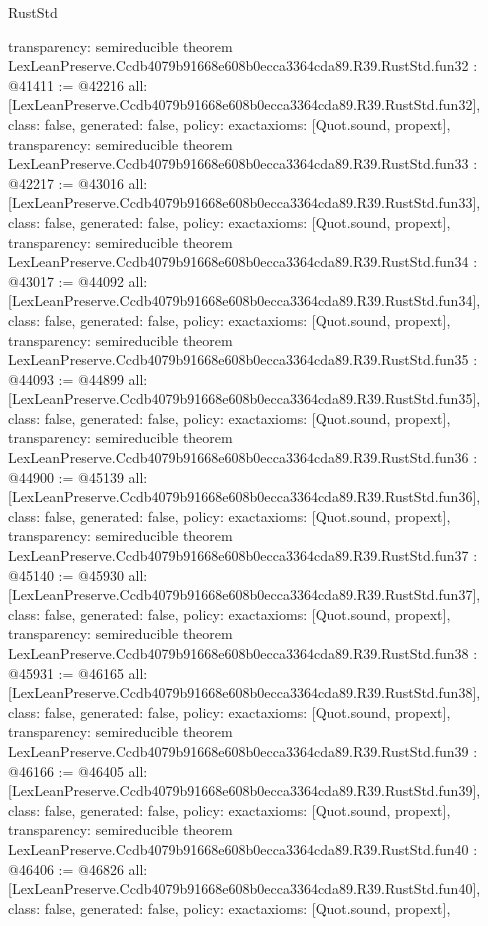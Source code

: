 \begin{lexlean}{RustStd}
\begin{coremodule}
{  transparency: semireducible
}
theorem LexLeanPreserve.Ccdb4079b91668e608b0ecca3364cda89.R39.RustStd.fun32 : @41411 := @42216 {
  all: [LexLeanPreserve.Ccdb4079b91668e608b0ecca3364cda89.R39.RustStd.fun32],
  class: false,
  generated: false,
  policy: exact{axioms: [Quot.sound, propext]},
  transparency: semireducible
}
theorem LexLeanPreserve.Ccdb4079b91668e608b0ecca3364cda89.R39.RustStd.fun33 : @42217 := @43016 {
  all: [LexLeanPreserve.Ccdb4079b91668e608b0ecca3364cda89.R39.RustStd.fun33],
  class: false,
  generated: false,
  policy: exact{axioms: [Quot.sound, propext]},
  transparency: semireducible
}
theorem LexLeanPreserve.Ccdb4079b91668e608b0ecca3364cda89.R39.RustStd.fun34 : @43017 := @44092 {
  all: [LexLeanPreserve.Ccdb4079b91668e608b0ecca3364cda89.R39.RustStd.fun34],
  class: false,
  generated: false,
  policy: exact{axioms: [Quot.sound, propext]},
  transparency: semireducible
}
theorem LexLeanPreserve.Ccdb4079b91668e608b0ecca3364cda89.R39.RustStd.fun35 : @44093 := @44899 {
  all: [LexLeanPreserve.Ccdb4079b91668e608b0ecca3364cda89.R39.RustStd.fun35],
  class: false,
  generated: false,
  policy: exact{axioms: [Quot.sound, propext]},
  transparency: semireducible
}
theorem LexLeanPreserve.Ccdb4079b91668e608b0ecca3364cda89.R39.RustStd.fun36 : @44900 := @45139 {
  all: [LexLeanPreserve.Ccdb4079b91668e608b0ecca3364cda89.R39.RustStd.fun36],
  class: false,
  generated: false,
  policy: exact{axioms: [Quot.sound, propext]},
  transparency: semireducible
}
theorem LexLeanPreserve.Ccdb4079b91668e608b0ecca3364cda89.R39.RustStd.fun37 : @45140 := @45930 {
  all: [LexLeanPreserve.Ccdb4079b91668e608b0ecca3364cda89.R39.RustStd.fun37],
  class: false,
  generated: false,
  policy: exact{axioms: [Quot.sound, propext]},
  transparency: semireducible
}
theorem LexLeanPreserve.Ccdb4079b91668e608b0ecca3364cda89.R39.RustStd.fun38 : @45931 := @46165 {
  all: [LexLeanPreserve.Ccdb4079b91668e608b0ecca3364cda89.R39.RustStd.fun38],
  class: false,
  generated: false,
  policy: exact{axioms: [Quot.sound, propext]},
  transparency: semireducible
}
theorem LexLeanPreserve.Ccdb4079b91668e608b0ecca3364cda89.R39.RustStd.fun39 : @46166 := @46405 {
  all: [LexLeanPreserve.Ccdb4079b91668e608b0ecca3364cda89.R39.RustStd.fun39],
  class: false,
  generated: false,
  policy: exact{axioms: [Quot.sound, propext]},
  transparency: semireducible
}
theorem LexLeanPreserve.Ccdb4079b91668e608b0ecca3364cda89.R39.RustStd.fun40 : @46406 := @46826 {
  all: [LexLeanPreserve.Ccdb4079b91668e608b0ecca3364cda89.R39.RustStd.fun40],
  class: false,
  generated: false,
  policy: exact{axioms: [Quot.sound, propext]},
}
\end{coremodule}
\end{lexlean}
